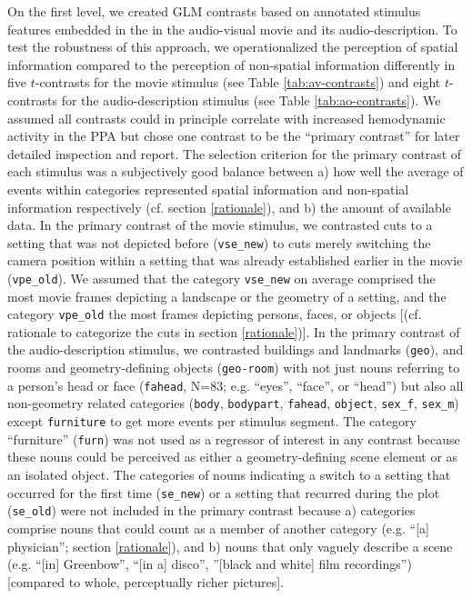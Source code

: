 \documentclass[english]{article}
\begin{document}
On the first level, we created GLM contrasts based on annotated stimulus
features embedded in the in the audio-visual movie and its audio-description.
To test the robustness of this approach, we operationalized the perception of
spatial information compared to the perception of non-spatial information
differently in five $t$-contrasts for the movie stimulus (see Table
\ref{tab:av-contrasts}) and eight $t$-contrasts for the audio-description stimulus (see Table
\ref{tab:ao-contrasts}).
We assumed all contrasts could in principle correlate with increased hemodynamic
activity in the PPA but chose one contrast to be the ``primary contrast'' for
later detailed inspection and report.
The selection criterion for the primary contrast of each stimulus was a
subjectively good balance between a) how well the average of events within
categories represented spatial information and non-spatial information
respectively (cf. section \ref{rationale}), and b) the amount of available data.
In the primary contrast of the movie stimulus, we contrasted cuts to a setting that
was not depicted before (\texttt{vse\_new}) to cuts merely switching the camera
position within a setting that was already established earlier in the movie
(\texttt{vpe\_old}).
We assumed that the category \texttt{vse\_new} on average comprised the most
movie frames depicting a landscape or the geometry of a setting, and the
category \texttt{vpe\_old} the most frames depicting persons, faces, or objects
[(cf.  rationale to categorize the cuts in section \ref{rationale})].
In the primary contrast of the audio-description stimulus, we contrasted buildings and
landmarks (\texttt{geo}), and rooms and geometry-defining objects
(\texttt{geo-room}) with not just nouns referring to a person's head or face
(\texttt{fahead}, N=83; e.g.  ``eyes'', ``face'', or ``head'') but also all
non-geometry related categories (\texttt{body}, \texttt{bodypart},
\texttt{fahead}, \texttt{object}, \texttt{sex\_f}, \texttt{sex\_m}) except
\texttt{furniture} to get more events per stimulus segment.
The category ``furniture'' (\texttt{furn}) was not used as a regressor of
interest in any contrast because these nouns could be perceived as either a
geometry-defining scene element or as an isolated object.
The categories of nouns indicating a switch to a setting that occurred for the
first time (\texttt{se\_new}) or a setting that recurred during the plot
(\texttt{se\_old}) were not included in the primary contrast because
a) categories comprise nouns that could count as a member of another category
(e.g. ``[a] physician''; section \ref{rationale}), and
b) nouns that only vaguely describe a scene (e.g. ``[in] Greenbow'', ``[in a]
disco'', ''[black and white] film recordings'') [compared to whole, perceptually
richer pictures].
\end{document}
